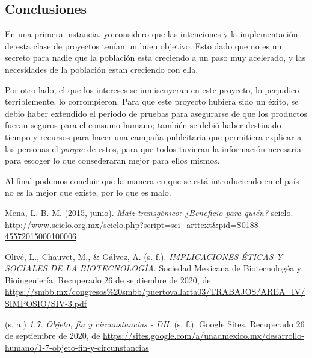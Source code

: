\documentclass[12pt]{article}
\begin{document}
\subsection*{Conclusiones}
	\par En una primera instancia, yo considero que las intenciones y la implementaci\'on de esta clase de proyectos ten\'ian un buen objetivo. Esto dado que no es un secreto para nadie que la poblaci\'on esta creciendo a un paso muy acelerado, y las necesidades de la poblaci\'on estan creciendo con ella.
	\par Por otro lado, el que los intereses se inmiscuyeran en este proyecto, lo perjudico terriblemente, lo corrompieron. Para que este proyecto hubiera sido un \'exito, se debio haber extendido el periodo de pruebas para asegurarse de que los productos fueran seguros para el consumo humano; tambi\'en se debi\'o haber destinado tiempo y recursos para hacer una campa\~na publcitaria que permitiera explicar a las personas el \textit{porque} de estos, para que todos tuvieran la informaci\'on necesaria para escoger lo que consederaran mejor para ellos mismos.
	\par Al final podemos concluir que la manera en que se está introduciendo en el país no es la mejor que existe, por lo que es malo.


\begin{thebibliography}{X}
	 Mena, L. B. M. (2015, junio). \textit{Maíz transgénico: ¿Beneficio para quién?} scielo. \url{http://www.scielo.org.mx/scielo.php?script=sci_arttext&pid=S0188-45572015000100006}

	 Oliv\'e, L., Chauvet, M., \& G\'alvez, A. (s. f.). \textit{IMPLICACIONES \'ETICAS Y SOCIALES DE LA BIOTECNOLOG\'IA}. Sociedad Mexicana de Biotecnolog\'ea y Bioingenier\'ia. Recuperado 26 de septiembre de 2020, de \url{https://smbb.mx/congresos%20smbb/puertovallarta03/TRABAJOS/AREA_IV/SIMPOSIO/SIV-3.pdf}
	
	 (s. a.) \textit{1.7. Objeto, fin y circunstancias - DH}. (s. f.). Google Sites. Recuperado 26 de septiembre de 2020, de \url{https://sites.google.com/a/unadmexico.mx/desarrollo-humano/1-7-objeto-fin-y-circunstancias}
\end{thebibliography}
\end{document}
